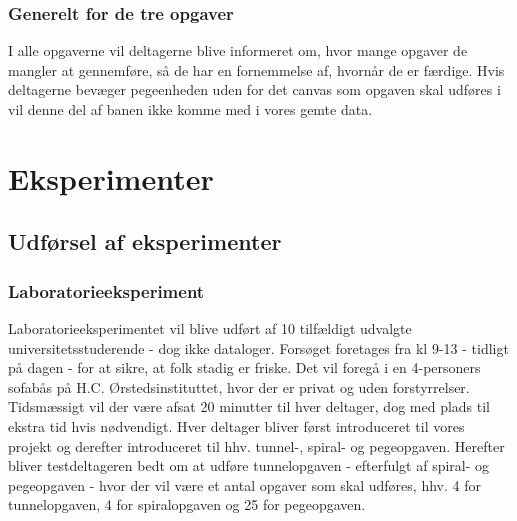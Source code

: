 \subsection*{Generelt for de tre opgaver}
I alle opgaverne vil deltagerne blive informeret om, hvor mange opgaver de mangler at gennemføre, så de har en fornemmelse af, hvornår de er færdige. Hvis deltagerne bevæger pegeenheden uden for det canvas som opgaven skal udføres i vil denne del af banen ikke komme med i vores gemte data.

\chapter*{Eksperimenter}

\section*{Udførsel af eksperimenter}

\subsection*{Laboratorieeksperiment}
Laboratorieeksperimentet vil blive udført af 10 tilfældigt udvalgte universitetsstuderende - dog ikke dataloger.
Forsøget foretages fra kl 9-13 - tidligt på dagen - for at sikre, at folk stadig er friske. Det vil foregå i en 4-personers sofabås på H.C. Ørstedsinstituttet, hvor der er privat og uden forstyrrelser.
Tidsmæssigt vil der være afsat 20 minutter til hver deltager, dog med plads til ekstra tid hvis nødvendigt.
Hver deltager bliver først introduceret til vores projekt og derefter introduceret til hhv. tunnel-, spiral- og pegeopgaven.
Herefter bliver testdeltageren bedt om at udføre tunnelopgaven - efterfulgt af spiral- og pegeopgaven - hvor der vil være et antal opgaver som skal udføres, hhv. 4 for tunnelopgaven, 4 for spiralopgaven og 25 for pegeopgaven.

